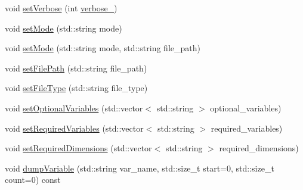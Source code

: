 \begin{DoxyCompactItemize}
\item 
void \mbox{\hyperlink{class_an_en_i_o_a696dff7bb250fc45b597e5f82e33e23e}{set\+Verbose}} (int \mbox{\hyperlink{class_an_en_i_o_a4f6abd007730e4a8f54d57cc3572bd9e}{verbose\+\_\+}})
\item 
void \mbox{\hyperlink{class_an_en_i_o_a0f3889bc1652077a4b41016393f0b7c6}{set\+Mode}} (std\+::string mode)
\item 
void \mbox{\hyperlink{class_an_en_i_o_aa199cf152c5c165e9c98d237830ba9ec}{set\+Mode}} (std\+::string mode, std\+::string file\+\_\+path)
\item 
void \mbox{\hyperlink{class_an_en_i_o_a98066d375cc78694fda2af1ce37cc8d8}{set\+File\+Path}} (std\+::string file\+\_\+path)
\item 
void \mbox{\hyperlink{class_an_en_i_o_a00fce5619b087353debcb2a602007f31}{set\+File\+Type}} (std\+::string file\+\_\+type)
\item 
void \mbox{\hyperlink{class_an_en_i_o_abc499df15eac5fa3f203267723f5edfa}{set\+Optional\+Variables}} (std\+::vector$<$ std\+::string $>$ optional\+\_\+variables)
\item 
void \mbox{\hyperlink{class_an_en_i_o_a643c51c346118d8416fa2c2e0da8042a}{set\+Required\+Variables}} (std\+::vector$<$ std\+::string $>$ required\+\_\+variables)
\item 
void \mbox{\hyperlink{class_an_en_i_o_a239ea94b3648006920bcdcded4040ad3}{set\+Required\+Dimensions}} (std\+::vector$<$ std\+::string $>$ required\+\_\+dimensions)
\item 
void \mbox{\hyperlink{class_an_en_i_o_acd5682e81361d75ff5566ae1df5fa023}{dump\+Variable}} (std\+::string var\+\_\+name, std\+::size\+\_\+t start=0, std\+::size\+\_\+t count=0) const
\end{DoxyCompactItemize}
